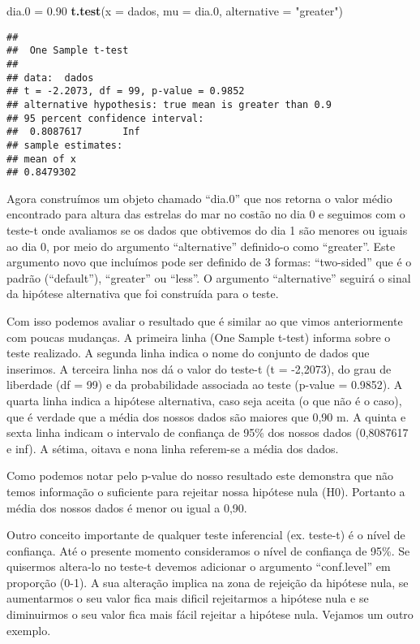 \documentclass[]{book}
\newenvironment{Shaded}{\begin{snugshade}}{\end{snugshade}}
\newcommand{\DataTypeTok}[1]{\textcolor[rgb]{0.13,0.29,0.53}{#1}}
\newcommand{\FloatTok}[1]{\textcolor[rgb]{0.00,0.00,0.81}{#1}}
\newcommand{\KeywordTok}[1]{\textcolor[rgb]{0.13,0.29,0.53}{\textbf{#1}}}
\newcommand{\NormalTok}[1]{#1}
\newcommand{\StringTok}[1]{\textcolor[rgb]{0.31,0.60,0.02}{#1}}
\begin{document}
\begin{Shaded}
\begin{Highlighting}[]
\NormalTok{dia}\FloatTok{.0}\NormalTok{ =}\StringTok{ }\FloatTok{0.90}
\KeywordTok{t.test}\NormalTok{(}\DataTypeTok{x =}\NormalTok{ dados, }\DataTypeTok{mu =}\NormalTok{ dia}\FloatTok{.0}\NormalTok{, }\DataTypeTok{alternative =} \StringTok{"greater"}\NormalTok{)}
\end{Highlighting}
\end{Shaded}

\begin{verbatim}
## 
##  One Sample t-test
## 
## data:  dados
## t = -2.2073, df = 99, p-value = 0.9852
## alternative hypothesis: true mean is greater than 0.9
## 95 percent confidence interval:
##  0.8087617       Inf
## sample estimates:
## mean of x 
## 0.8479302
\end{verbatim}

Agora construímos um objeto chamado ``dia.0'' que nos retorna o valor médio encontrado para altura das estrelas do mar no costão no dia 0 e seguimos com o teste-t onde avaliamos se os dados que obtivemos do dia 1 são menores ou iguais ao dia 0, por meio do argumento ``alternative'' definido-o como ``greater''. Este argumento novo que incluímos pode ser definido de 3 formas: ``two-sided'' que é o padrão (``default''), ``greater'' ou ``less''. O argumento ``alternative'' seguirá o sinal da hipótese alternativa que foi construída para o teste.

Com isso podemos avaliar o resultado que é similar ao que vimos anteriormente com poucas mudanças. A primeira linha (One Sample t-test) informa sobre o teste realizado. A segunda linha indica o nome do conjunto de dados que inserimos. A terceira linha nos dá o valor do teste-t (t = -2,2073), do grau de liberdade (df = 99) e da probabilidade associada ao teste (p-value = 0.9852). A quarta linha indica a hipótese alternativa, caso seja aceita (o que não é o caso), que é verdade que a média dos nossos dados são maiores que 0,90 m. A quinta e sexta linha indicam o intervalo de confiança de 95\% dos nossos dados (0,8087617 e inf). A sétima, oitava e nona linha referem-se a média dos dados.

Como podemos notar pelo p-value do nosso resultado este demonstra que não temos informação o suficiente para rejeitar nossa hipótese nula (H0). Portanto a média dos nossos dados é menor ou igual a 0,90.

Outro conceito importante de qualquer teste inferencial (ex. teste-t) é o nível de confiança. Até o presente momento consideramos o nível de confiança de 95\%. Se quisermos altera-lo no teste-t devemos adicionar o argumento ``conf.level'' em proporção (0-1). A sua alteração implica na zona de rejeição da hipótese nula, se aumentarmos o seu valor fica mais dificil rejeitarmos a hipótese nula e se diminuirmos o seu valor fica mais fácil rejeitar a hipótese nula. Vejamos um outro exemplo.
\end{document}
